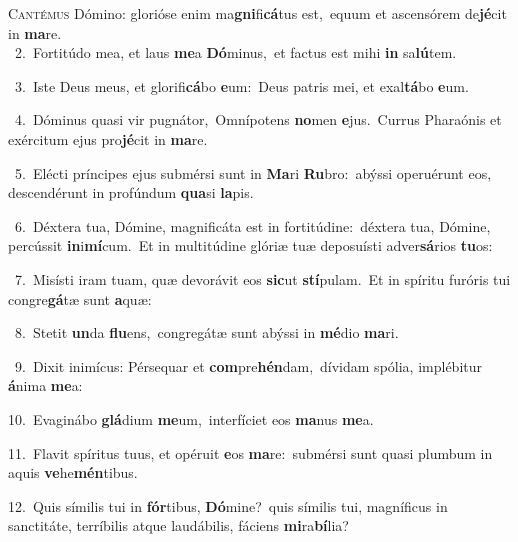 \lettrine{\initial\textcolor{\initialcolor}{C}}{antémus} Dómino: glorióse enim ma\-\textbf{gni}\-fi\-\textbf{cá}\-tus est,~\star equum et ascensórem de\-\textbf{jé}\-cit in \textbf{ma}\-re.\\
{\numbfont\textcolor{\numbcolor}{~2.}}~Fortitúdo mea, et laus \textbf{me}\-a \textbf{Dó}\-minus,~\star et factus est mihi \textbf{in} sa\-\textbf{lú}\-tem.\par
{\numbfont\textcolor{\numbcolor}{~3.}}~Iste Deus meus, et glorifi\-\textbf{cá}\-bo \textbf{e}\-um:~\star Deus patris mei, et exal\-\textbf{tá}\-bo \textbf{e}\-um.\par
{\numbfont\textcolor{\numbcolor}{~4.}}~Dóminus quasi vir pugnátor,~\dagger Omnípotens \textbf{no}\-men \textbf{e}\-jus.~\star Currus Pharaónis et exércitum ejus pro\-\textbf{jé}\-cit in \textbf{ma}\-re.\par
{\numbfont\textcolor{\numbcolor}{~5.}}~Elécti príncipes ejus submérsi sunt in \textbf{Ma}\-ri \textbf{Ru}\-bro:~\star abýssi operuérunt eos, descendérunt in profúndum \textbf{qua}\-si \textbf{la}\-pis.\par
{\numbfont\textcolor{\numbcolor}{~6.}}~Déxtera tua, Dómine, magnificáta est in fortitúdine:~\dagger déxtera tua, Dómine, percússit \textbf{in}\-i\-\textbf{mí}\-cum.~\star Et in multitúdine glóriæ tuæ deposuísti adver\-\textbf{sá}\-rios \textbf{tu}\-os:\par
{\numbfont\textcolor{\numbcolor}{~7.}}~Misísti iram tuam, quæ devorávit eos \textbf{sic}\-ut \textbf{stí}\-pulam.~\star Et in spíritu furóris tui congre\-\textbf{gá}\-tæ sunt \textbf{a}\-quæ:\par
{\numbfont\textcolor{\numbcolor}{~8.}}~Stetit \textbf{un}\-da \textbf{flu}\-ens,~\star congregátæ sunt abýssi in \textbf{mé}\-dio \textbf{ma}\-ri.\par
{\numbfont\textcolor{\numbcolor}{~9.}}~Dixit inimícus: Pérsequar et \textbf{com}\-pre\-\textbf{hén}\-dam,~\star dívidam spólia, implébitur \textbf{á}\-nima \textbf{me}\-a:\par
{\numbfont\textcolor{\numbcolor}{10.}}~Evaginábo \textbf{glá}\-dium \textbf{me}\-um,~\star interfíciet eos \textbf{ma}\-nus \textbf{me}\-a.\par
{\numbfont\textcolor{\numbcolor}{11.}}~Flavit spíritus tuus, et opéruit \textbf{e}\-os \textbf{ma}\-re:~\star submérsi sunt quasi plumbum in aquis \textbf{ve}\-he\-\textbf{mén}\-tibus.\par
{\numbfont\textcolor{\numbcolor}{12.}}~Quis símilis tui in \textbf{fór}\-tibus, \textbf{Dó}\-mine?~\star quis símilis tui, magníficus in sanctitáte, terríbilis atque laudábilis, fáciens \textbf{mi}\-ra\-\textbf{bí}\-lia?\par
